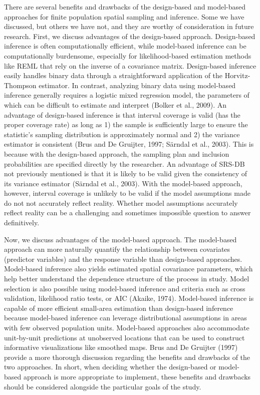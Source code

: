 \documentclass[]{elsarticle} %
\begin{document}
There are several benefits and drawbacks of the design-based and
model-based approaches for finite population spatial sampling and
inference. Some we have discussed, but others we have not, and they are
worthy of consideration in future research. First, we discuss advantages
of the design-based approach. Design-based inference is often
computationally efficient, while model-based inference can be
computationally burdensome, especially for likelihood-based estimation
methods like REML that rely on the inverse of a covariance matrix.
Design-based inference easily handles binary data through a
straightforward application of the Horvitz-Thompson estimator. In
contrast, analyzing binary data using model-based inference generally
requires a logistic mixed regression model, the parameters of which can
be difficult to estimate and interpret (Bolker et al., 2009). An
advantage of design-based inference is that interval coverage is valid
(has the proper coverage rate) as long as 1) the sample is sufficiently
large to ensure the statistic's sampling distribution is approximately
normal and 2) the variance estimator is consistent (Brus and De
Gruijter, 1997; Särndal et al., 2003). This is because with the
design-based approach, the sampling plan and inclusion probabilities are
specified directly by the researcher. An advantage of SRS-DB not
previously mentioned is that it is likely to be valid given the
consistency of its variance estimator (Särndal et al., 2003). With the
model-based approach, however, interval coverage is unlikely to be valid
if the model assumptions made do not not accurately reflect reality.
Whether model assumptions accurately reflect reality can be a
challenging and sometimes impossible question to answer definitively.

Now, we discuss advantages of the model-based approach. The model-based
approach can more naturally quantify the relationship between covariates
(predictor variables) and the response variable than design-based
approaches. Model-based inference also yields estimated spatial
covariance parameters, which help better understand the dependence
structure of the process in study. Model selection is also possible
using model-based inference and criteria such as cross validation,
likelihood ratio tests, or AIC (Akaike, 1974). Model-based inference is
capable of more efficient small-area estimation than design-based
inference because model-based inference can leverage distributional
assumptions in areas with few observed population units. Model-based
approaches also accommodate unit-by-unit predictions at unobserved
locations that can be used to construct informative visualizations like
smoothed maps. Brus and De Gruijter (1997) provide a more thorough
discussion regarding the benefits and drawbacks of the two approaches.
In short, when deciding whether the design-based or model-based approach
is more appropriate to implement, these benefits and drawbacks should be
considered alongside the particular goals of the study.
\end{document}
